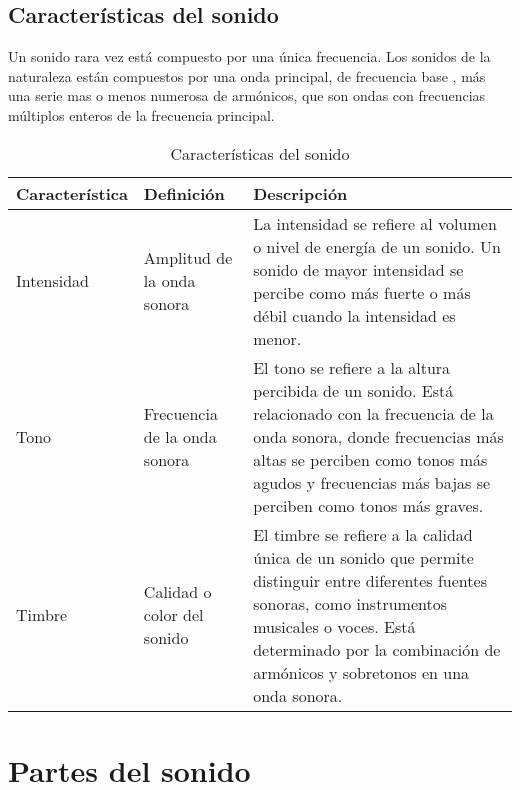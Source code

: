 \documentclass[
	12pt, %
	fleqn, %
	a4paper, %
	oneside, %
]{LegrandOrangeBook}
\begin{document}
\subsection{Características del sonido}
Un sonido rara vez está compuesto por una única frecuencia. Los sonidos de la naturaleza están compuestos por una  onda principal, de frecuencia base , más una serie mas o menos numerosa de armónicos, que son ondas con frecuencias múltiplos enteros de la frecuencia principal.
\begin{table}[ht]
\centering
\begin{tabularx}{\textwidth}{|X|X|X|}
\hline
\textbf{Característica} & \textbf{Definición} & \textbf{Descripción} \\
\hline
Intensidad & Amplitud de la onda sonora & La intensidad se refiere al volumen o nivel de energía de un sonido. Un sonido de mayor intensidad se percibe como más fuerte o más débil cuando la intensidad es menor. \\
\hline
Tono & Frecuencia de la onda sonora & El tono se refiere a la altura percibida de un sonido. Está relacionado con la frecuencia de la onda sonora, donde frecuencias más altas se perciben como tonos más agudos y frecuencias más bajas se perciben como tonos más graves. \\
\hline
Timbre & Calidad o color del sonido & El timbre se refiere a la calidad única de un sonido que permite distinguir entre diferentes fuentes sonoras, como instrumentos musicales o voces. Está determinado por la combinación de armónicos y sobretonos en una onda sonora. \\
\hline
\end{tabularx}
\caption{Características del sonido}
\end{table}
\section{Partes del sonido}
\end{document}
